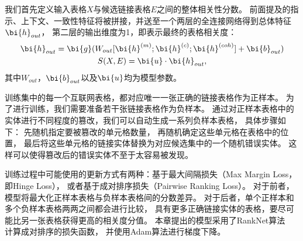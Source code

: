我们首先定义输入表格$X$与候选链接表格$E$之间的整体相关性分数。
前面提及的指示、上下文、一致性特征将被拼接，并送至一个两层的全连接网络得到总体特征$\bi{h}_{out}$，
第二层的输出维度为1，即表示最终的表格相关度：
\begin{equation}
  \label{eqn:score}
  \begin{gathered}
    \bi{h}_{out}  = \bi{g}(W_{out}[\bi{h}^{(m)}; \bi{h}^{(c)}; \bi{h}^{(coh)}] + \bi{b}_{out}) \\
    S(X, E)         = \bi{u} \cdot \bi{h}_{out},
  \end{gathered}
\end{equation}
\noindent
其中$W_{out}$，$\bi{b}_{out}$以及$\bi{u}$均为模型参数。

训练集中的每一个互联网表格，都对应唯一一张正确的链接表格作为正样本。
为了进行训练，我们需要准备若干张链接表格作为负样本。
通过对正样本表格中的实体进行不同程度的篡改，我们可以自动生成一系列负样本表格，
具体步骤如下：
先随机指定要被篡改的单元格数量，
再随机确定这些单元格在表格中的位置，
最后将这些单元格的链接实体替换为对应候选集中的一个随机错误实体。
这样可以使得篡改后的错误实体不至于太容易被发现。

训练过程中可能使用的更新方式有两种：基于最大间隔损失（Max Margin Loss，即Hinge Loss），
或者基于成对排序损失（Pairwise Ranking Loss）。
对于前者，模型将最大化正样本表格与负样本表格间的分数差异。
对于后者，单个正样本和多个负样本表格两两之间都会进行比较，
具有更多正确链接实体的表格，要尽可能比另一张表格获得更高的相关度分值。
本章提出的模型采用了RankNet算法~\cite{burges2010ranknet}
计算成对排序的损失函数，
并使用Adam算法\cite{kingma2014adam}进行梯度下降。

